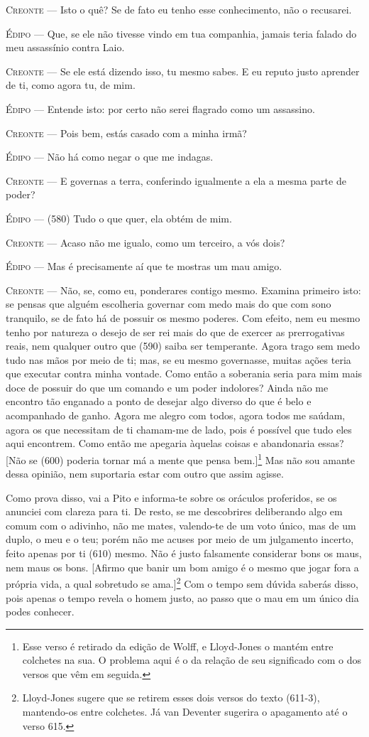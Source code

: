 \textsc{Creonte} --- Isto o quê? Se de fato eu tenho esse conhecimento, não o recusarei.

\textsc{Édipo} --- Que, se ele não tivesse vindo em tua companhia, jamais teria falado do
meu assassínio contra Laio.

\textsc{Creonte} --- Se ele está dizendo isso, tu mesmo sabes. E eu reputo justo aprender de
ti, como agora tu, de mim.

\textsc{Édipo} --- Entende isto: por certo não serei flagrado como um assassino.

\textsc{Creonte} --- Pois bem, estás casado com a minha irmã?

\textsc{Édipo} --- Não há como negar o que me indagas.

\textsc{Creonte} --- E governas a terra, conferindo igualmente a ela a mesma parte de poder?

\textsc{Édipo} --- (580) Tudo o que quer, ela obtém de mim.

\textsc{Creonte} --- Acaso não me igualo, como um terceiro, a vós dois?

\textsc{Édipo} --- Mas é precisamente aí que te mostras um mau amigo.

\textsc{Creonte} --- Não, se, como eu, ponderares contigo mesmo. Examina primeiro isto: se
pensas que alguém escolheria governar com medo mais do que com sono
tranquilo, se de fato há de possuir os mesmo poderes. Com efeito, nem eu
mesmo tenho por natureza o desejo de ser rei mais do que de exercer as
prerrogativas reais, nem qualquer outro que (590) saiba ser temperante.
Agora trago sem medo tudo nas mãos por meio de ti; mas, se eu mesmo
governasse, muitas ações teria que executar contra minha vontade. Como
então a soberania seria para mim mais doce de possuir do que um comando
e um poder indolores? Ainda não me encontro tão enganado a ponto de
desejar algo diverso do que é belo e acompanhado de ganho. Agora me
alegro com todos, agora todos me saúdam, agora os que necessitam de ti
chamam-me de lado, pois é possível que tudo eles aqui encontrem. Como
então me apegaria àquelas coisas e abandonaria essas? {[}Não se (600)
poderia tornar má a mente que pensa bem.{]}\footnote{Esse verso é
  retirado da edição de Wolff, e Lloyd-Jones o mantém entre colchetes na
  sua. O problema aqui é o da relação de seu significado com o dos
  versos que vêm em seguida.} Mas não sou amante dessa opinião, nem
suportaria estar com outro que assim agisse.

Como prova disso, vai a Pito e informa-te sobre os oráculos proferidos,
se os anunciei com clareza para ti. De resto, se me descobrires
deliberando algo em comum com o adivinho, não me mates, valendo-te de um
voto único, mas de um duplo, o meu e o teu; porém não me acuses por meio
de um julgamento incerto, feito apenas por ti (610) mesmo. Não é justo
falsamente considerar bons os maus, nem maus os bons. {[}Afirmo que
banir um bom amigo é o mesmo que jogar fora a própria vida, a qual
sobretudo se ama.{]}\footnote{Lloyd-Jones sugere que se retirem esses
  dois versos do texto (611-3), mantendo-os entre colchetes. Já van
  Deventer sugerira o apagamento até o verso 615.} Com o tempo sem
dúvida saberás disso, pois apenas o tempo revela o homem justo, ao passo
que o mau em um único dia podes conhecer.

